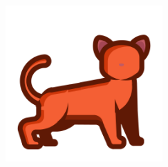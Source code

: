 \frenchspacing %

\raggedbottom %




\pagestyle{plain} %





\begin{titlepage}

\begin{addmargin}[-1cm]{-3cm}
\begin{center}
\large

\hfill
\vfill

\begingroup
\color{Maroon} \\ \bigskip %

\endgroup


\vfill
\includegraphics[width=6cm]{assets/logo.png} \\ \medskip %


\vfill

\end{center}
\end{addmargin}

\end{titlepage}

